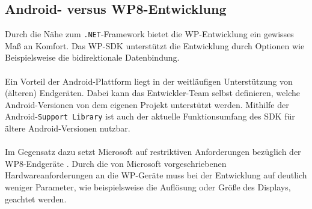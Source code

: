 \documentclass[Bachelorarbeit.tex]{subfiles}
\begin{document}
\subsection*{Android- versus \ac{WP}8-Entwicklung}
Durch die Nähe zum \texttt{.NET}-Framework bietet die \ac{WP}-Entwicklung ein gewisses Maß an Komfort.
Das \ac{WP}-\ac{SDK} unterstützt die Entwicklung durch Optionen wie Beispielsweise die bidirektionale Datenbindung.\\
\\
Ein Vorteil der Android-Plattform liegt in der weitläufigen Unterstützung von (älteren) Endgeräten. 
Dabei kann das Entwickler-Team selbst definieren, welche Android-Versionen von dem eigenen Projekt unterstützt werden.
Mithilfe der Android-\texttt{Support Library} ist auch der aktuelle Funktionsumfang des \ac{SDK} für ältere Android-Versionen nutzbar. \parencite[vgl.:][]{android_supportLib}\\
\\
Im Gegensatz dazu setzt Microsoft auf restriktiven Anforderungen bezüglich der \ac{WP}8-Endgeräte \parencite[vgl.:][ab Abschnitt: Hardware]{wp8_review}.
Durch die von Microsoft vorgeschriebenen Hardwareanforderungen an die \ac{WP}-Geräte muss bei der Entwicklung auf deutlich weniger Parameter, wie beispielsweise die Auflösung oder Größe des Displays, geachtet werden.
\\
\end{document}

